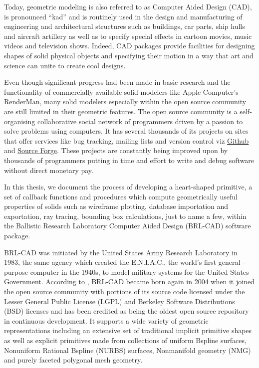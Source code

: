 \hspace{30}Today, geometric modeling is also referred to as Computer ­Aided Design
(CAD), is pronounced “kad” and is routinely used in the design and
manufacturing of engineering and architectural structures such as buildings, car  
parts, ship hulls and aircraft artillery as well as to specify special effects in  
cartoon movies, music videos and television shows. Indeed, CAD packages
provide facilities for designing shapes of solid physical objects and specifying
their motion in a way that art and science can unite to create cool designs.  

\hspace{30} Even though significant progress had been made in basic research and
the functionality of commercially available solid modelers like Apple
Computer's RenderMan, many solid modelers especially within the open
source community are still limited in their geometric features. The open
source community is a self­ organising collaborative social network of 
programmers driven by a passion to solve problems using computers.
It has several thousands of its projects on sites that offer services 
like bug tracking, mailing lists and version control viz \href{https://github.com/}{Github} 
and \href{http://sourceforge.net}{Source Forge}. These projects are constantly 
being improved upon by thousands of programmers putting in time and effort 
to write and debug software without direct monetary pay.

\hspace{30} In this thesis, we document the process of developing a heart­-shaped
primitive, a set of callback functions and procedures which compute geometrically 
useful properties of solids such as wireframe plotting, database importation and 
exportation, ray tracing, bounding box calculations, just to name a few, within the
 Ballistic Research Laboratory Computer Aided Design (BRL-­CAD) software package.  

\hspace{30} BRL-­CAD was initiated by the United States Army Research Laboratory
in 1983, the same agency which created the E.N.I.A.C., the world's first 
general ­purpose computer in the 1940s, to model military systems for the
United States Government. According to \cite{3}, BRL-­CAD became born again in 
2004 when it joined the open source community with portions of its source
code licensed under the Lesser General Public License (LGPL) and Berkeley
Software Distributions (BSD) licenses and has been credited as being the
oldest open source repository in continuous development. It supports a wide
variety of geometric representations including an extensive set of traditional
implicit primitive shapes as well as explicit primitives made from collections of
uniform B­spline surfaces, Non­uniform Rational B­spline (NURBS) surfaces,  
Non­manifold geometry (NMG) and purely faceted polygonal mesh geometry.  

